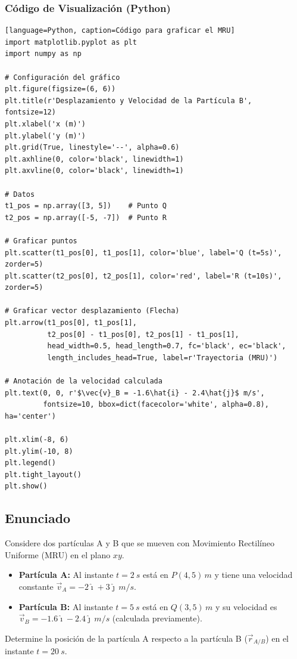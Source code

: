 \documentclass[12pt, a4paper]{article}
\begin{document}
\subsubsection*{Código de Visualización (Python)}

\begin{verbatim}[language=Python, caption=Código para graficar el MRU]
import matplotlib.pyplot as plt
import numpy as np

# Configuración del gráfico
plt.figure(figsize=(6, 6))
plt.title(r'Desplazamiento y Velocidad de la Partícula B', fontsize=12)
plt.xlabel('x (m)')
plt.ylabel('y (m)')
plt.grid(True, linestyle='--', alpha=0.6)
plt.axhline(0, color='black', linewidth=1)
plt.axvline(0, color='black', linewidth=1)

# Datos
t1_pos = np.array([3, 5])    # Punto Q
t2_pos = np.array([-5, -7])  # Punto R

# Graficar puntos
plt.scatter(t1_pos[0], t1_pos[1], color='blue', label='Q (t=5s)', zorder=5)
plt.scatter(t2_pos[0], t2_pos[1], color='red', label='R (t=10s)', zorder=5)

# Graficar vector desplazamiento (Flecha)
plt.arrow(t1_pos[0], t1_pos[1], 
          t2_pos[0] - t1_pos[0], t2_pos[1] - t1_pos[1], 
          head_width=0.5, head_length=0.7, fc='black', ec='black', 
          length_includes_head=True, label=r'Trayectoria (MRU)')

# Anotación de la velocidad calculada
plt.text(0, 0, r'$\vec{v}_B = -1.6\hat{i} - 2.4\hat{j}$ m/s', 
         fontsize=10, bbox=dict(facecolor='white', alpha=0.8), ha='center')

plt.xlim(-8, 6)
plt.ylim(-10, 8)
plt.legend()
plt.tight_layout()
plt.show()
\end{verbatim}

\newpage

\subsection*{Enunciado}
Considere dos partículas A y B que se mueven con Movimiento Rectilíneo Uniforme (MRU) en el plano $xy$.
\begin{itemize}
    \item \textbf{Partícula A:} Al instante $t = \SI{2}{s}$ está en $P(4, 5)\,\si{m}$ y tiene una velocidad constante $\vec{v}_A = -2\hat{\imath} + 3\hat{\jmath} \, \si{m/s}$.
    \item \textbf{Partícula B:} Al instante $t = \SI{5}{s}$ está en $Q(3, 5)\,\si{m}$ y su velocidad es $\vec{v}_B = -1.6\hat{\imath} - 2.4\hat{\jmath} \, \si{m/s}$ (calculada previamente).
\end{itemize}
Determine la posición de la partícula A respecto a la partícula B ($\vec{r}_{A/B}$) en el instante $t = \SI{20}{s}$.
\end{document}
